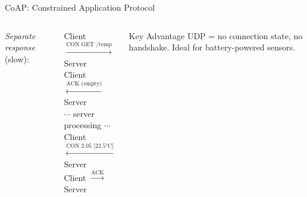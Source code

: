 \documentclass[aspectratio=169,11pt]{beamer}
\begin{document}
\begin{frame}{CoAP: Constrained Application Protocol}
\begin{columns}
        \vspace{0.05cm}
        \textit{Separate response} (slow):
        \begin{center}
        \scriptsize
        Client $\xrightarrow{\text{CON GET /temp}}$ Server\\
        Client $\xleftarrow{\text{ACK (empty)}}$ Server\\
        $\cdots$ server processing $\cdots$\\
        Client $\xleftarrow{\text{CON 2.05 [22.5°C]}}$ Server\\
        Client $\xrightarrow{\text{ACK}}$ Server
        \normalsize
        \end{center}
        
        \begin{alertblock}{Key Advantage}
            UDP = no connection state, no handshake. Ideal for battery-powered sensors.
        \end{alertblock}
    \end{columns}
\end{frame}
\end{document}

